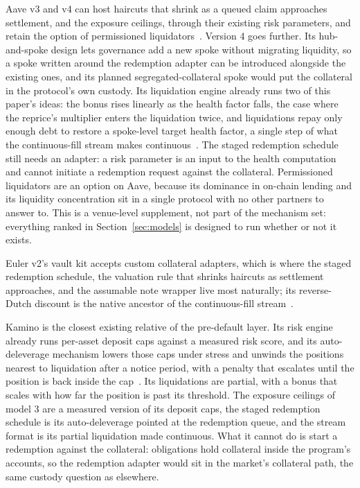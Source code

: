 \documentclass[11pt,a4paper]{article}
\begin{document}
Aave v3 and v4 can host haircuts that shrink as a queued claim approaches settlement, and the exposure ceilings, through their existing risk parameters, and retain the option of permissioned liquidators~\cite{aavedocs}. Version 4 goes further. Its hub-and-spoke design lets governance add a new spoke without migrating liquidity, so a spoke written around the redemption adapter can be introduced alongside the existing ones, and its planned segregated-collateral spoke would put the collateral in the protocol's own custody. Its liquidation engine already runs two of this paper's ideas: the bonus rises linearly as the health factor falls, the case where the reprice's multiplier enters the liquidation twice, and liquidations repay only enough debt to restore a spoke-level target health factor, a single step of what the continuous-fill stream makes continuous~\cite{aavedocs}. The staged redemption schedule still needs an adapter: a risk parameter is an input to the health computation and cannot initiate a redemption request against the collateral. Permissioned liquidators are an option on Aave, because its dominance in on-chain lending and its liquidity concentration sit in a single protocol with no other partners to answer to. This is a venue-level supplement, not part of the mechanism set: everything ranked in Section~\ref{sec:models} is designed to run whether or not it exists.

Euler v2's vault kit accepts custom collateral adapters, which is where the staged redemption schedule, the valuation rule that shrinks haircuts as settlement approaches, and the assumable note wrapper live most naturally; its reverse-Dutch discount is the native ancestor of the continuous-fill stream~\cite{eulerdocs}.

Kamino is the closest existing relative of the pre-default layer. Its risk engine already runs per-asset deposit caps against a measured risk score, and its auto-deleverage mechanism lowers those caps under stress and unwinds the positions nearest to liquidation after a notice period, with a penalty that escalates until the position is back inside the cap~\cite{kamino}. Its liquidations are partial, with a bonus that scales with how far the position is past its threshold. The exposure ceilings of model 3 are a measured version of its deposit caps, the staged redemption schedule is its auto-deleverage pointed at the redemption queue, and the stream format is its partial liquidation made continuous. What it cannot do is start a redemption against the collateral: obligations hold collateral inside the program's accounts, so the redemption adapter would sit in the market's collateral path, the same custody question as elsewhere.
\end{document}
